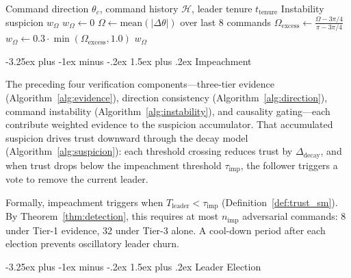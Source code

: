 \documentclass[conference]{IEEEtran}
\makeatletter
\renewcommand{\subsection}{\@startsection{subsection}{2}{\z@}%
  {-3.25ex plus -1ex minus -.2ex}%
  {1.5ex plus .2ex}%
  {\normalfont\normalsize\itshape\centering}}
\makeatother
\begin{document}
\begin{algorithm}[h]
\caption{Command Instability Check}
\label{alg:instability}
\begin{algorithmic}[1]
\REQUIRE Command direction $\theta_c$, command history $\mathcal{H}$, leader tenure $t_{\text{tenure}}$
\ENSURE Instability suspicion $w_{\Omega}$
\STATE $w_{\Omega} \leftarrow 0$
    \STATE $\Omega \leftarrow \text{mean}(|\Delta\theta|)$ over last 8 commands
        \STATE $\Omega_{\text{excess}} \leftarrow \frac{\Omega - 3\pi/4}{\pi - 3\pi/4}$
        \STATE $w_{\Omega} \leftarrow 0.3 \cdot \min(\Omega_{\text{excess}}, 1.0)$
    \ENDIF
\ENDIF
\RETURN $w_{\Omega}$
\end{algorithmic}
\end{algorithm}

\subsection{Impeachment}
\label{sec:impeachment}

The preceding four verification components---three-tier evidence (Algorithm~\ref{alg:evidence}), direction consistency (Algorithm~\ref{alg:direction}), command instability (Algorithm~\ref{alg:instability}), and causality gating---each contribute weighted evidence to the suspicion accumulator. That accumulated suspicion drives trust downward through the decay model (Algorithm~\ref{alg:suspicion}): each threshold crossing reduces trust by $\Delta_{\text{decay}}$, and when trust drops below the impeachment threshold $\tau_{\text{imp}}$, the follower triggers a vote to remove the current leader.

Formally, impeachment triggers when $T_{\text{leader}} < \tau_{\text{imp}}$ (Definition~\ref{def:trust_sm}). By Theorem~\ref{thm:detection}, this requires at most $n_{\text{imp}}$ adversarial commands: 8 under Tier-1 evidence, 32 under Tier-3 alone. A cool-down period after each election prevents oscillatory leader churn.


\subsection{Leader Election}
\label{sec:election}
\end{document}
